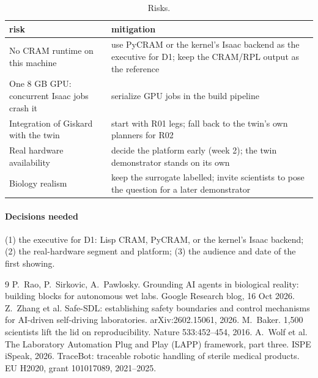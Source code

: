 \documentclass[10.5pt,a4paper]{article}
\begin{document}
\begin{table}[htbp]\centering\footnotesize\caption{Risks.}
\begin{tabularx}{\linewidth}{@{}p{4.2cm}X@{}}\toprule risk & mitigation \\\midrule
No CRAM runtime on this machine & use PyCRAM or the kernel's Isaac backend as the executive for D1; keep the CRAM/RPL output as the reference \\
One 8 GB GPU: concurrent Isaac jobs crash it & serialize GPU jobs in the build pipeline \\
Integration of Giskard with the twin & start with R01 legs; fall back to the twin's own planners for R02 \\
Real hardware availability & decide the platform early (week 2); the twin demonstrator stands on its own \\
Biology realism & keep the surrogate labelled; invite scientists to pose the question for a later demonstrator \\\bottomrule\end{tabularx}\end{table}


\paragraph{Decisions needed} (1) the executive for D1: Lisp CRAM, PyCRAM, or the kernel's Isaac backend; (2) the
real-hardware segment and platform; (3) the audience and date of the first showing.

\begin{thebibliography}{9}\small
{} P.~Rao, P.~Sirkovic, A.~Pawlosky. Grounding AI agents in biological reality: building blocks for
autonomous wet labs. Google Research blog, 16 Oct 2026.
 Z.~Zhang et al. Safe-SDL: establishing safety boundaries and control mechanisms for AI-driven
self-driving laboratories. arXiv:2602.15061, 2026.
 M.~Baker. 1,500 scientists lift the lid on reproducibility. Nature 533:452--454, 2016.
 A.~Wolf et al. The Laboratory Automation Plug and Play (LAPP) framework, part three. ISPE iSpeak, 2026.
 TraceBot: traceable robotic handling of sterile medical products. EU H2020, grant 101017089, 2021--2025.
\end{thebibliography}
\end{document}
